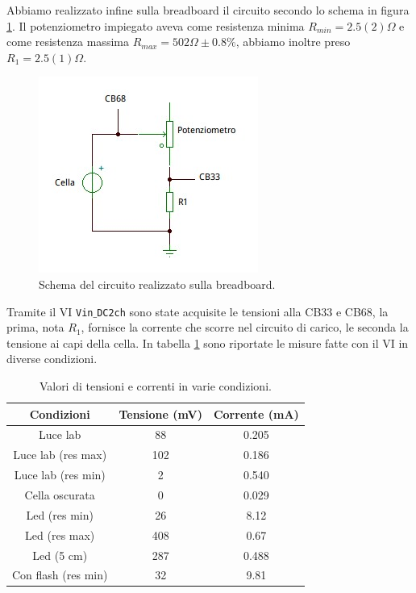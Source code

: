 \documentclass[journal, a4paper]{IEEEtran}
\begin{document}
Abbiamo realizzato infine sulla breadboard il circuito secondo lo schema in figura \ref{fig:mis}. Il potenziometro impiegato aveva come resistenza minima $R_{min} = 2.5(2) \Omega$ e come resistenza massima $R_{max}  = 502 \Omega \pm 0.8 \%$, abbiamo inoltre preso $R_1 = 2.5(1) \Omega$.\\

\begin{figure}[htp]
\centering
\includegraphics[scale=.6]{misura}
\caption{Schema del circuito realizzato sulla breadboard.}
\label{fig:mis}
\end{figure}

 Tramite il VI \texttt{Vin$\_$DC2ch} sono state acquisite le tensioni alla CB33 e CB68, la prima, nota $R_1$, fornisce la corrente che scorre nel circuito di carico, le seconda la tensione ai capi della cella. In tabella \ref{tab:cond} sono riportate le misure fatte con il VI in diverse condizioni.
 
\begin{table}
\centering
\caption{Valori di tensioni e correnti in varie condizioni.}
\label{tab:cond}
\begin{tabular}{|c|c|c|}
\hline 
Condizioni & Tensione (mV) & Corrente (mA) \\ 
\hline 
Luce lab & 88 & 0.205 \\ 
\hline 
Luce lab (res max) & 102 & 0.186 \\ 
\hline 
Luce lab (res min) & 2 & 0.540 \\ 
\hline 
Cella oscurata & 0 & 0.029 \\ 
\hline 
Led (res min) & 26 & 8.12 \\ 
\hline 
Led (res max) & 408 &  0.67\\ 
\hline 
Led (5 cm) & 287 & 0.488 \\ 
\hline 
Con flash (res min)& 32 & 9.81 \\ 
\hline 
\end{tabular} 
\end{table}
\end{document}
